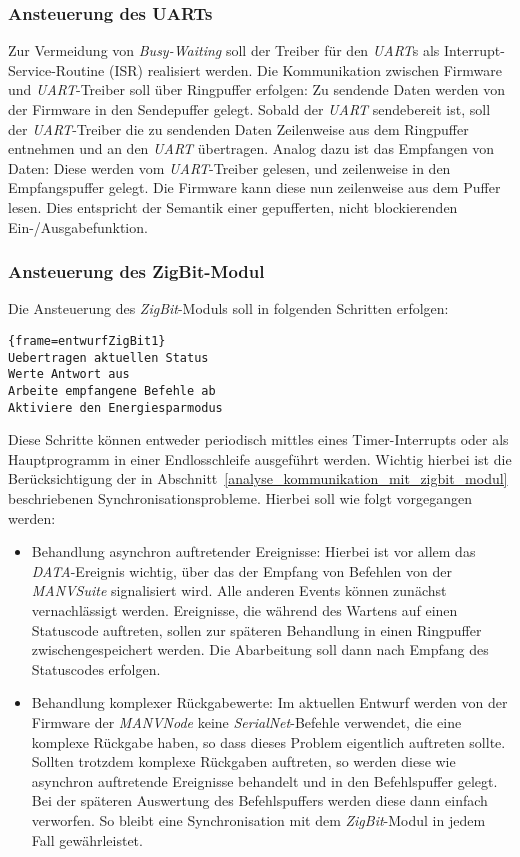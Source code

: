 \subsubsection{Ansteuerung des UARTs}
Zur Vermeidung von \emph{Busy-Waiting} soll der Treiber für den \emph{UART}s als Interrupt-Service-Routine (ISR)
realisiert werden. Die Kommunikation zwischen Firmware und \emph{UART}-Treiber soll über Ringpuffer erfolgen:
Zu sendende Daten werden von der Firmware in den Sendepuffer gelegt. Sobald der \emph{UART} sendebereit ist, 
soll der \emph{UART}-Treiber die zu sendenden Daten Zeilenweise aus dem Ringpuffer entnehmen und an
den \emph{UART} übertragen. Analog dazu ist das Empfangen von Daten: Diese werden vom \emph{UART}-Treiber gelesen,
und zeilenweise in den Empfangspuffer gelegt. Die Firmware kann diese nun zeilenweise aus dem Puffer lesen.
Dies entspricht der Semantik einer gepufferten, nicht blockierenden Ein-/Ausgabefunktion.

\subsubsection{Ansteuerung des ZigBit-Modul}
Die Ansteuerung des \emph{ZigBit}-Moduls soll in folgenden Schritten erfolgen: 

\begin{lstlisting}{frame=entwurfZigBit1}
Uebertragen aktuellen Status
Werte Antwort aus
Arbeite empfangene Befehle ab
Aktiviere den Energiesparmodus
\end{lstlisting}

Diese Schritte können entweder periodisch mittles eines Timer-Interrupts oder als Hauptprogramm in einer Endlosschleife
ausgeführt werden. Wichtig hierbei ist die Berücksichtigung der in Abschnitt~\ref{analyse_kommunikation_mit_zigbit_modul}
beschriebenen Synchronisationsprobleme. Hierbei soll wie folgt vorgegangen werden:

\begin{itemize}
    \item{Behandlung asynchron auftretender Ereignisse:} Hierbei ist vor allem das \emph{DATA}-Ereignis wichtig, über das
    der Empfang von Befehlen von der \emph{MANVSuite} signalisiert wird. Alle anderen Events können zunächst vernachlässigt
    werden. Ereignisse, die während des Wartens auf einen Statuscode auftreten, sollen zur späteren Behandlung in einen
    Ringpuffer zwischengespeichert werden. Die Abarbeitung soll dann nach Empfang des Statuscodes erfolgen.

    \item{Behandlung komplexer Rückgabewerte:} Im aktuellen Entwurf werden von der Firmware der \emph{MANVNode} keine 
    \emph{SerialNet}-Befehle verwendet, die eine komplexe Rückgabe haben, so dass dieses Problem eigentlich auftreten 
    sollte. Sollten trotzdem komplexe Rückgaben auftreten, so werden diese wie asynchron auftretende Ereignisse behandelt
    und in den Befehlspuffer gelegt. Bei der späteren Auswertung des Befehlspuffers werden diese dann einfach verworfen.
    So bleibt eine Synchronisation mit dem \emph{ZigBit}-Modul in jedem Fall gewährleistet.
\end{itemize}

